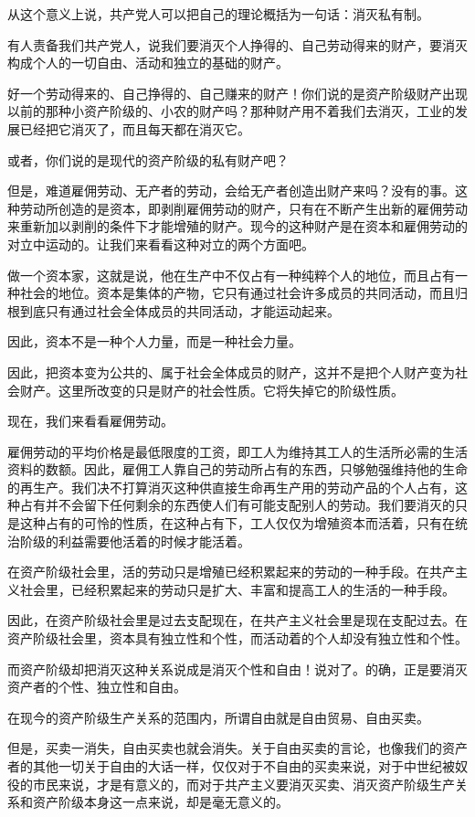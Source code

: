 \documentclass[UTF8,zihao=-4,a4paper]{ctexart}
\begin{document}
从这个意义上说，共产党人可以把自己的理论概括为一句话：消灭私有制。\par
有人责备我们共产党人，说我们要消灭个人挣得的、自己劳动得来的财产，要消灭构成个人的一切自由、活动和独立的基础的财产。\par
好一个劳动得来的、自己挣得的、自己赚来的财产！你们说的是资产阶级财产出现以前的那种小资产阶级的、小农的财产吗？那种财产用不着我们去消灭，工业的发展已经把它消灭了，而且每天都在消灭它。\par
或者，你们说的是现代的资产阶级的私有财产吧？\par
但是，难道雇佣劳动、无产者的劳动，会给无产者创造出财产来吗？没有的事。这种劳动所创造的是资本，即剥削雇佣劳动的财产，只有在不断产生出新的雇佣劳动来重新加以剥削的条件下才能增殖的财产。现今的这种财产是在资本和雇佣劳动的对立中运动的。让我们来看看这种对立的两个方面吧。\par
做一个资本家，这就是说，他在生产中不仅占有一种纯粹个人的地位，而且占有一种社会的地位。资本是集体的产物，它只有通过社会许多成员的共同活动，而且归根到底只有通过社会全体成员的共同活动，才能运动起来。\par
因此，资本不是一种个人力量，而是一种社会力量。\par
因此，把资本变为公共的、属于社会全体成员的财产，这并不是把个人财产变为社会财产。这里所改变的只是财产的社会性质。它将失掉它的阶级性质。\par
现在，我们来看看雇佣劳动。\par
雇佣劳动的平均价格是最低限度的工资，即工人为维持其工人的生活所必需的生活资料的数额。因此，雇佣工人靠自己的劳动所占有的东西，只够勉强维持他的生命的再生产。我们决不打算消灭这种供直接生命再生产用的劳动产品的个人占有，这种占有并不会留下任何剩余的东西使人们有可能支配别人的劳动。我们要消灭的只是这种占有的可怜的性质，在这种占有下，工人仅仅为增殖资本而活着，只有在统治阶级的利益需要他活着的时候才能活着。\par
在资产阶级社会里，活的劳动只是增殖已经积累起来的劳动的一种手段。在共产主义社会里，已经积累起来的劳动只是扩大、丰富和提高工人的生活的一种手段。\par
因此，在资产阶级社会里是过去支配现在，在共产主义社会里是现在支配过去。在资产阶级社会里，资本具有独立性和个性，而活动着的个人却没有独立性和个性。\par
而资产阶级却把消灭这种关系说成是消灭个性和自由！说对了。的确，正是要消灭资产者的个性、独立性和自由。\par
在现今的资产阶级生产关系的范围内，所谓自由就是自由贸易、自由买卖。\par
但是，买卖一消失，自由买卖也就会消失。关于自由买卖的言论，也像我们的资产者的其他一切关于自由的大话一样，仅仅对于不自由的买卖来说，对于中世纪被奴役的市民来说，才是有意义的，而对于共产主义要消灭买卖、消灭资产阶级生产关系和资产阶级本身这一点来说，却是毫无意义的。\par
\end{document}

